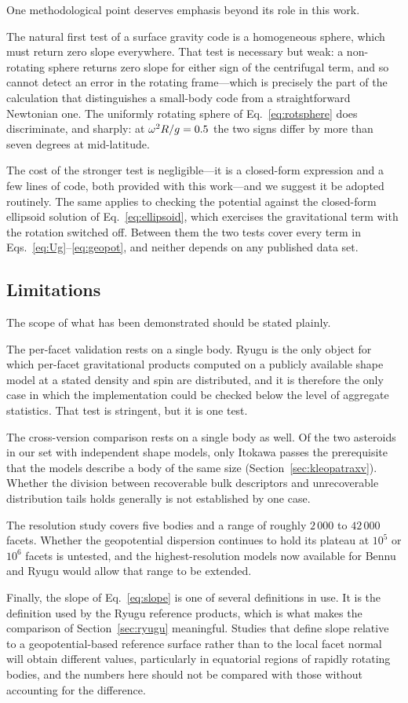 One methodological point deserves emphasis beyond its role in this work.

The natural first test of a surface gravity code is a homogeneous sphere, which
must return zero slope everywhere. That test is necessary but weak: a
non-rotating sphere returns zero slope for either sign of the centrifugal term,
and so cannot detect an error in the rotating frame---which is precisely the
part of the calculation that distinguishes a small-body code from a
straightforward Newtonian one. The uniformly rotating sphere of
Eq.~\eqref{eq:rotsphere} does discriminate, and sharply: at
$\omega^{2}R/g = 0.5$ the two signs differ by more than seven degrees at
mid-latitude.

The cost of the stronger test is negligible---it is a closed-form expression and
a few lines of code, both provided with this work---and we suggest it be adopted
routinely. The same applies to checking the potential against the closed-form
ellipsoid solution of Eq.~\eqref{eq:ellipsoid}, which exercises the
gravitational term with the rotation switched off. Between them the two tests
cover every term in Eqs.~\eqref{eq:Ug}--\eqref{eq:geopot}, and neither depends
on any published data set.

\subsection{Limitations}
\label{sec:limitations}

The scope of what has been demonstrated should be stated plainly.

The per-facet validation rests on a single body. Ryugu is the only object for
which per-facet gravitational products computed on a publicly available shape
model at a stated density and spin are distributed, and it is therefore the only
case in which the implementation could be checked below the level of aggregate
statistics. That test is stringent, but it is one test.

The cross-version comparison rests on a single body as well. Of the two
asteroids in our set with independent shape models, only Itokawa passes the
prerequisite that the models describe a body of the same size
(Section~\ref{sec:kleopatraxv}). Whether the division between recoverable bulk
descriptors and unrecoverable distribution tails holds generally is not
established by one case.

The resolution study covers five bodies and a range of roughly $2\,000$ to
$42\,000$ facets. Whether the geopotential dispersion continues to hold its plateau
at $10^{5}$ or $10^{6}$ facets is untested, and the highest-resolution models
now available for Bennu and Ryugu would allow that range to be extended.

Finally, the slope of Eq.~\eqref{eq:slope} is one of several definitions in use.
It is the definition used by the Ryugu reference products, which is what makes
the comparison of Section~\ref{sec:ryugu} meaningful. Studies that define slope
relative to a geopotential-based reference surface rather than to the local
facet normal will obtain different values, particularly in equatorial regions of
rapidly rotating bodies, and the numbers here should not be compared with those
without accounting for the difference.
